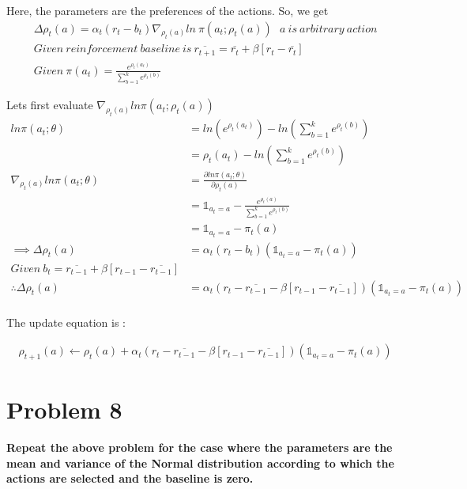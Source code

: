 \documentclass [11pt]{article}
\numberwithin{equation}{section}
\begin{document}
Here, the parameters are the preferences of the actions. So, we get 
\begin{align*}
    \Delta \rho_t(a) = \alpha_t (r_t - b_t) \nabla_{\rho_t(a)}
    ln \ \pi(a_t;\rho_t(a)) \ \ \ a \ is \ arbitrary \ action  \\
    Given \ reinforcement \ baseline \ is \ \overline{r_{t+1}} = \overline{r_t} + β [r{_t} - \overline{r_t} ] \\
    Given \ \pi(a_t) = \frac{e^{\rho_t(a_t)}}{\sum_{b=1}^k e^{\rho_t(b)}}
\end{align*}

Lets first evaluate $ \nabla_{\rho_t(a)} ln \pi(a_t;\rho_t(a)) $ 
\begin{align*}
    ln \pi(a_t;\theta) &= ln(e^{\rho_t(a_t)}) - ln (\sum_{b=1}^k e^{\rho_t(b)})   \\
    &= \rho_t(a_t) - ln (\sum_{b=1}^k e^{\rho_t(b)})  \\
    \nabla_{\rho_t(a)} ln \pi(a_t;\theta) &=  \frac{\partial ln \pi(a_t;\theta)}{\partial \rho_t(a)}    \\
    &=  \mathbb{1}_{a_t = a} - \frac{e^{\rho_t(a)}}{\sum_{b=1}^k e^{\rho_t(b)}}   \\
    &=  \mathbb{1}_{a_t = a} - \pi_t(a)     \\
    \implies \Delta \rho_t(a) &= \alpha_t(r_t - b_t)(\mathbb{1}_{a_t = a} - \pi_t(a)) \\
    Given \ b_t = \overline{r_{t-1}} + \beta [r{_{t-1}} - \overline{r_{t-1}} ]  \\
    \therefore \Delta \rho_t(a) &= \alpha_t(r_t -  \overline{r_{t-1}} - \beta [r{_{t-1}} - \overline{r_{t-1}} ])(\mathbb{1}_{a_t = a} - \pi_t(a))     \\
\end{align*}

The update equation is  :

\begin{align*}
    \rho_{t+1}(a) \leftarrow \rho_{t}(a) + \alpha_t(r_t -  \overline{r_{t-1}} - \beta [r{_{t-1}} - \overline{r_{t-1}} ])(\mathbb{1}_{a_t = a} - \pi_t(a))
\end{align*}


\vspace{0.5cm}

\section*{Problem 8}
\textbf{Repeat the above problem for the case where the parameters are the mean and variance of the Normal distribution according to which the actions are selected and the baseline is zero.}
\end{document}
